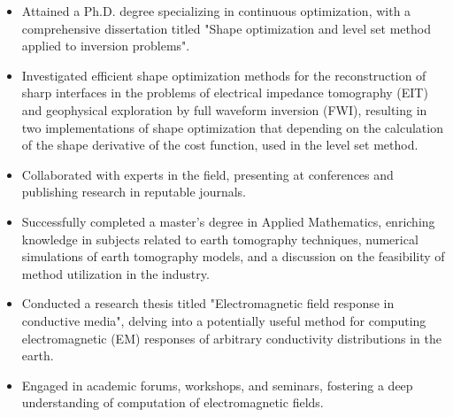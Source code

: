 \documentclass[10pt,a4paper,ragged2e,withhyper,academicons]{altacv}
\begin{document}
\begin{paracol}{1}
\begin{itemize}
    \item Attained a Ph.D. degree specializing in continuous optimization, with a comprehensive dissertation titled "Shape optimization and level set method applied to inversion problems".
    \item Investigated efficient shape optimization methods for the reconstruction of sharp interfaces in the problems of electrical impedance tomography (EIT) and geophysical exploration by full waveform inversion (FWI), resulting in two implementations of shape optimization that depending on the calculation of the shape derivative of the cost function, used in the level set method.
    \item Collaborated with experts in the field, presenting at conferences and publishing research in reputable journals.
\end{itemize}

\divider

\begin{itemize}
    \item Successfully completed a master's degree in Applied Mathematics, enriching knowledge in subjects related to earth tomography techniques, numerical simulations of earth tomography models, and a discussion on the feasibility of method utilization in the industry.  
    \item Conducted a research thesis titled "Electromagnetic field response in conductive media"\cite{mastersthesis}, delving into a potentially useful method for computing electromagnetic (EM) responses of arbitrary conductivity distributions in the earth.
    \item Engaged in academic forums, workshops, and seminars, fostering a deep understanding of computation of electromagnetic fields. 
\end{itemize}
\divider


\end{paracol}
\end{document}
